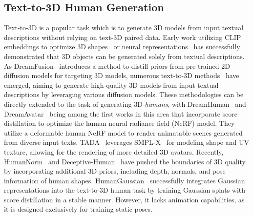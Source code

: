

\subsection{Text-to-3D Human Generation}

Text-to-3D is a popular task which is to generate 3D models from input textual descriptions without relying on text-3D paired data.
Early work utilizing CLIP~\cite{radford2021learning} embeddings to optimize 3D shapes~\cite{sanghi2022clip} or neural representations~\cite{jain2022zero} has successfully demonstrated that 3D objects can be generated solely from textual descriptions.
As DreamFusion~\cite{poole2022dreamfusion} introduces a method to distill priors from pre-trained 2D diffusion models for targeting 3D models, numerous text-to-3D methods~\cite{tang2023dreamgaussian, yi2023gaussiandreamer, wang2024prolificdreamer} have emerged, aiming to generate high-quality 3D models from input textual descriptions by leveraging various diffusion models.
These methodologies can be directly extended to the task of generating 3D {\it humans}, with DreamHuman~\cite{kolotouros2024dreamhuman} and DreamAvatar~\cite{cao2024dreamavatar} being among the first works in this area that incorporate score distillation to optimize the human neural radiance field (NeRF) model. 
They utilize a deformable human NeRF model to render animatable scenes generated from diverse input texts.
TADA~\cite{liao2024tada} leverages SMPL-X~\cite{SMPL-X:2019} for modeling shape and UV texture, allowing for the rendering of more detailed 3D avatars. 
Recently, HumanNorm~\cite{huang2024humannorm} and Deceptive-Human~\cite{kao2023deceptive} have pushed the boundaries of 3D quality by incorporating additional 3D priors, including depth, normals, and pose information of human shapes.
HumanGaussian~\cite{liu2024humangaussian} successfully integrates Gaussian representations into the text-to-3D human task by training Gaussian splats with score distillation in a stable manner. However, it lacks animation capabilities, as it is designed exclusively for training static poses.